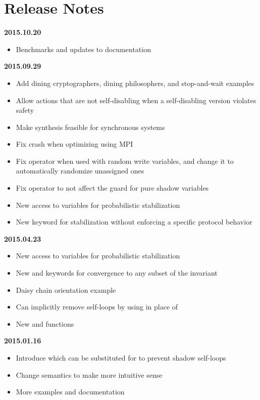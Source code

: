 
\section{Release Notes}

\textbf{2015.10.20}
\begin{itemize}
\item Benchmarks and updates to documentation
\end{itemize}
\textbf{2015.09.29}
\begin{itemize}
\item Add dining cryptographers, dining philosophers, and stop-and-wait examples
\item Allow actions that are not self-disabling when a self-disabling version violates safety
\item Make synthesis feasible for synchronous systems
\item Fix crash when optimizing using MPI
\item Fix \ilcode{-=>} operator when used with random write variables, and change it to automatically randomize unassigned ones
\item Fix \ilcode{-=>} operator to not affect the guard for pure shadow variables
\item New  access to variables for probabilistic stabilization
\item New  keyword for stabilization without enforcing a specific protocol behavior
\end{itemize}
\textbf{2015.04.23}
\begin{itemize}
\item New  access to variables for probabilistic stabilization
\item New  and  keywords for convergence to any subset of the invariant
\item Daisy chain orientation example
\item Can implicitly remove self-loops by using \ilcode{-=>} in place of \ilcode{-->}
\item New  and  functions
\end{itemize}
\textbf{2015.01.16}
\begin{itemize}
\item Introduce  which can be substituted for  to prevent shadow self-loops
\item Change  semantics to make more intuitive sense
\item More examples and documentation
\end{itemize}
